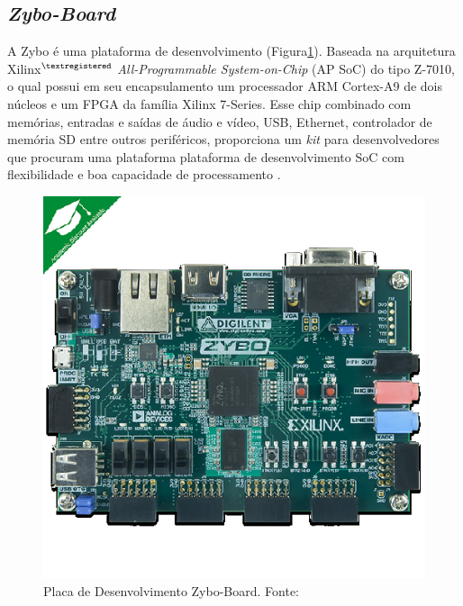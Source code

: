 \subsection{\textit{Zybo-Board}}
A Zybo é uma plataforma de desenvolvimento (Figura\ref{Zybo Board}).
Baseada na arquitetura Xilinx$^{\textregistered}$ \textit{All-Programmable System-on-Chip} (AP SoC)
do tipo Z-7010, o qual possui em seu encapsulamento um processador ARM Cortex-A9 de 
dois núcleos e um FPGA da família Xilinx 7-Series. Esse chip combinado com memórias, entradas 
e saídas de áudio e vídeo, USB, Ethernet, controlador de memória SD entre outros periféricos,
proporciona um \textit{kit} para desenvolvedores que procuram uma plataforma plataforma de desenvolvimento SoC com flexibilidade e boa capacidade de processamento \cite{DigilentZybo}.  

\begin{figure}[h]
	\centering
	\includegraphics[keepaspectratio=true,scale=1.0]{figuras/zyboboard.eps}
	\caption{Placa de Desenvolvimento Zybo-Board. Fonte: \cite{DigilentZybo}}
	\label{Zybo Board}
\end{figure}


